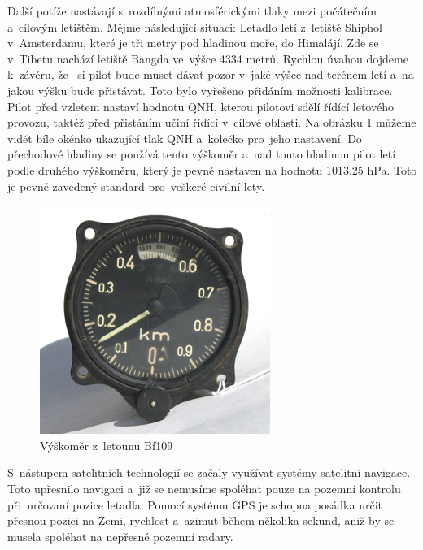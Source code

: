 		Další potíže nastávají s~rozdílnými atmosférickými tlaky mezi počátečním a~cílovým letištěm. Mějme následující situaci: Letadlo letí z~letiště Shiphol v~Amsterdamu, které je tři metry pod hladinou moře, do Himalájí. Zde se v~Tibetu nachází letiště Bangda ve~výšce 4334 metrů\cite{bangda}. Rychlou úvahou dojdeme k~závěru, že~ si pilot bude muset dávat pozor v~jaké výšce nad terénem letí a~na jakou výšku bude přistávat. Toto bylo vyřešeno přidáním možnosti kalibrace. Pilot před vzletem nastaví hodnotu QNH, kterou pilotovi sdělí řídící letového provozu, taktéž před přistáním učiní řídící v~cílové oblasti. Na obrázku \ref{historie::vyvojMereniVysky::109Altimeter} můžeme vidět bíle okénko ukazující tlak QNH a~kolečko pro~jeho nastavení. Do přechodové hladiny se používá tento výškoměr a~nad touto hladinou pilot letí podle druhého výškoměru, který je pevně nastaven na hodnotu 1013.25 hPa. Toto je pevně zavedený standard pro~veškeré civilní lety.\par
		
		\begin{figure}[H]
			\begin{center}
				\includegraphics[scale=0.75]{obrazky-figures/109Altimeter.jpg}
				\caption{Výškoměr z~letounu Bf109\protect\footnotemark}\label{historie::vyvojMereniVysky::109Altimeter}
			\end{center}
		\end{figure}
		
		S~nástupem satelitních technologií se začaly využívat systémy satelitní navigace. Toto upřesnilo navigaci a~již se nemusíme spoléhat pouze na pozemní kontrolu při~určovaní pozice letadla. Pomocí systému GPS je schopna posádka určit přesnou pozici na Zemi, rychlost a~azimut během několika sekund, aniž by se musela spoléhat na nepřesné pozemní radary.\par 
		
